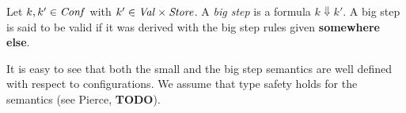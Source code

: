 \documentclass[12pt,a4paper]{report}
\newcommand{\CExp}{\nstyle{CExp}}
\newcommand{\Conf}{\nstyle{Conf}}
\begin{document}
\begin{definition}
  Let $k,k'\in\Conf$ with $k' \in \mathit{Val} \times \mathit{Store}$. A {\em big step} is a formula
  $k \Downarrow k'$. A big step is said to be valid if it was derived with the
  big step rules given {\bf somewhere else}.
\end{definition}

It is easy to see that both the small and the big step semantics are well defined
with respect to configurations. We assume that type safety holds for the semantics
(see Pierce, {\bf TODO}).

%
%
%
%
\end{document}

